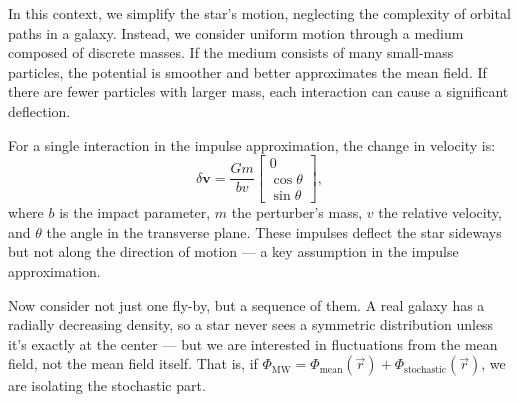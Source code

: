             In this context, we simplify the star's motion, neglecting the complexity of orbital paths in a galaxy. Instead, we consider uniform motion through a medium composed of discrete masses. If the medium consists of many small-mass particles, the potential is smoother and better approximates the mean field. If there are fewer particles with larger mass, each interaction can cause a significant deflection.

            For a single interaction in the impulse approximation, the change in velocity is:
            \begin{equation}
                \delta \mathbf{v} = \frac{Gm}{bv} \begin{bmatrix} 0 \\ \cos\theta \\ \sin\theta \end{bmatrix},
                \label{eq:delta_v_vec_impulse_approx}
            \end{equation}
            where $b$ is the impact parameter, $m$ the perturber's mass, $v$ the relative velocity, and $\theta$ the angle in the transverse plane. These impulses deflect the star sideways but not along the direction of motion — a key assumption in the impulse approximation.

            Now consider not just one fly-by, but a sequence of them. A real galaxy has a radially decreasing density, so a star never sees a symmetric distribution unless it's exactly at the center — but we are interested in fluctuations from the mean field, not the mean field itself. That is, if $\Phi_\mathrm{MW} = \Phi_\mathrm{mean}(\vec{r}) + \Phi_\mathrm{stochastic}(\vec{r})$, we are isolating the stochastic part.

